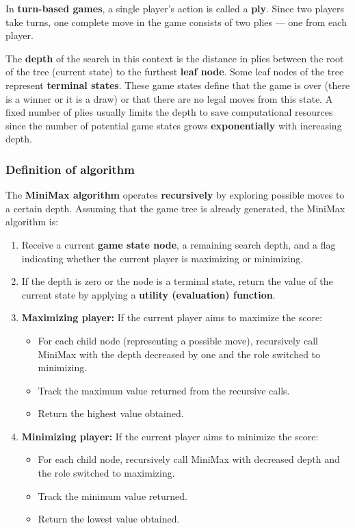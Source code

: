 In \textbf{turn-based games}, a single player's action is called a \textbf{ply}. Since two players take turns, one complete move in the game consists of two plies — one from each player.

The \textbf{depth} of the search in this context is the distance in plies between the root of the tree (current state) to the furthest \textbf{leaf node}. Some leaf nodes of the tree represent \textbf{terminal states}. These game states define that the game is over (there is a winner or it is a draw) or that there are no legal moves from this state. A fixed number of plies usually limits the depth to save computational resources since the number of potential game states grows \textbf{exponentially} with increasing depth.

\subsubsection{Definition of algorithm}

The \textbf{MiniMax algorithm} operates \textbf{recursively} by exploring possible moves to a certain depth. Assuming that the game tree is already generated, the MiniMax algorithm is:

\begin{enumerate}
  \item Receive a current \textbf{game state node}, a remaining search depth, and a flag indicating whether the current player is maximizing or minimizing.
  
  \item If the depth is zero or the node is a terminal state, return the value of the current state by applying a \textbf{utility (evaluation) function}.

  \item \textbf{Maximizing player:} If the current player aims to maximize the score:
  \begin{itemize}
    \item For each child node (representing a possible move), recursively call MiniMax with the depth decreased by one and the role switched to minimizing.
    \item Track the maximum value returned from the recursive calls.
    \item Return the highest value obtained.
  \end{itemize}

  \item \textbf{Minimizing player:} If the current player aims to minimize the score:
  \begin{itemize}
    \item For each child node, recursively call MiniMax with decreased depth and the role switched to maximizing.
    \item Track the minimum value returned.
    \item Return the lowest value obtained.
  \end{itemize}
\end{enumerate}




